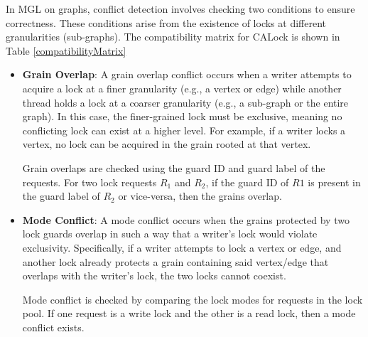 
In MGL on graphs, conflict detection involves checking two conditions to ensure correctness. These conditions arise from the existence of locks at different granularities (sub-graphs). The compatibility matrix for CALock is shown in Table \ref{compatibilityMatrix}
\begin{itemize}
	\item \textbf{Grain Overlap}: A grain overlap conflict occurs when a writer attempts to acquire a lock at a finer granularity (e.g., a vertex or edge) while another thread holds a lock at a coarser granularity (e.g., a sub-graph or the entire graph). In this case, the finer-grained lock must be exclusive, meaning no conflicting lock can exist at a higher level. For example, if a writer locks a vertex, no lock can be acquired in the grain rooted at that vertex. 
	
	Grain overlaps are checked using the guard ID and guard label of the requests. For two lock requests $R_1$ and $R_2$, if the guard ID of $R1$ is present in the guard label of $R_2$ or vice-versa, then the grains overlap.
	
	\item \textbf{Mode Conflict}: A mode conflict occurs when the grains protected by two lock guards overlap in such a way that a writer’s lock would violate exclusivity. Specifically, if a writer attempts to lock a vertex or edge, and another lock already protects a grain containing said vertex/edge that overlaps with the writer’s lock, the two locks cannot coexist.
	
	Mode conflict is checked by comparing the lock modes for requests in the lock pool. If one request is a write lock and the other is a read lock, then a mode conflict exists.
\end{itemize}




